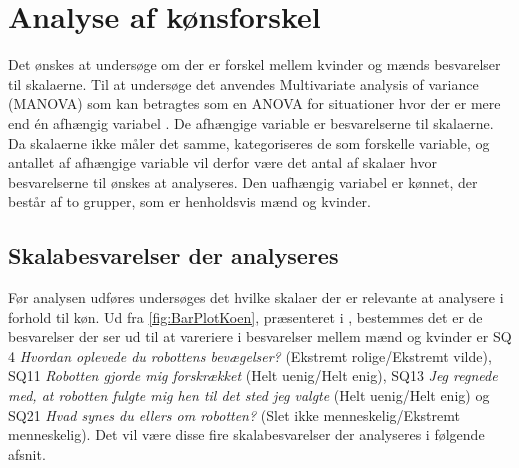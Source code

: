 \section{Analyse af kønsforskel}
\label{TestAfSkalaKoensforskel}
%
Det ønskes at undersøge om der er forskel mellem kvinder og mænds besvarelser til skalaerne. Til at undersøge det anvendes Multivariate analysis of variance (MANOVA) som kan betragtes som en ANOVA for situationer hvor der er mere end én afhængig variabel \parencite[s. 697]{FieldMANOVA}. 
De afhængige variable er besvarelserne til skalaerne. Da skalaerne ikke måler det samme, kategoriseres de som forskelle variable, og antallet af afhængige variable vil derfor være det antal af skalaer hvor besvarelserne til ønskes at analyseres. Den uafhængig variabel er kønnet, der består af to grupper, som er henholdsvis mænd og kvinder. 
%
\subsection{Skalabesvarelser der analyseres}
%
Før analysen udføres undersøges det hvilke skalaer der er relevante at analysere i forhold til køn. Ud fra \autoref{fig:BarPlotKoen}, præsenteret i , bestemmes det er de besvarelser der ser ud til at vareriere i besvarelser mellem mænd og kvinder er SQ 4 \textit{Hvordan oplevede du robottens bevægelser?} (Ekstremt rolige/Ekstremt vilde), SQ11 \textit{Robotten gjorde mig forskrækket }(Helt uenig/Helt enig), SQ13 \textit{Jeg regnede med, at robotten fulgte mig hen til det sted jeg valgte} (Helt uenig/Helt enig) og SQ21 \textit{Hvad synes du ellers om robotten?} (Slet ikke menneskelig/Ekstremt menneskelig). Det vil være disse fire skalabesvarelser der analyseres i følgende afsnit. \blankline
%

